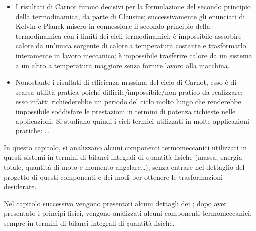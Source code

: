 \documentclass[letterpaper,10pt,italian]{jupyterBook}
\begin{document}
\begin{itemize}
\item {} 
\sphinxAtStartPar
{} I risultati di Carnot furono decisivi per la formulazione del secondo principio della termodinamica, da parte di Clausius; successivamente gli enunciati di Kelvin e Planck misero in connessione il secondo principio della termodinamica con i limiti dei cicli termodinamici: è impossibile assorbire calore da un’unica sorgente di calore a temperatura costante e trasformarlo interamente in lavoro meccanico; è impossibile trasferire calore da un sistema a un altro a temperatura maggiore senza fornire lavoro alla macchina.

\item {} 
\sphinxAtStartPar
{} Nonostante i risultati di efficienza massima del ciclo di Carnot, esso è di scarsa utilità pratica poiché difficile/impossibile/non pratico da realizzare: esso infatti richiederebbe un periodo del ciclo molto lungo che renderebbe impossibile soddisfare le prestazioni in termini di potenza richieste nelle applicazioni. Si studiano quindi i cicli termici utilizzati in molte applicazioni pratiche: …

\end{itemize}

\sphinxAtStartPar
In questo capitolo, si analizzano alcuni componenti termo\sphinxhyphen{}meccanici utilizzati in questi sistemi in termini di bilanci integrali di quantità fisiche (massa, energia totale, quantità di moto e momento angolare…), senza entrare nel dettaglio del progetto di questi componenti e dei modi per ottenere le trasformazioni desiderate.

\sphinxAtStartPar
Nel capitolo successivo vengono presentati alcuni dettagli dei {\hyperref[\detokenize{ch/thermodynamics/heat-transmission:physics-hs-thermodynamics-heat-transmission}]{}}; dopo aver presentato i princìpi fisici, vengono analizzati alcuni componenti termo\sphinxhyphen{}meccanici, sempre in termini di bilanci integrali di quantità fisiche.



\sphinxstepscope
\end{document}
